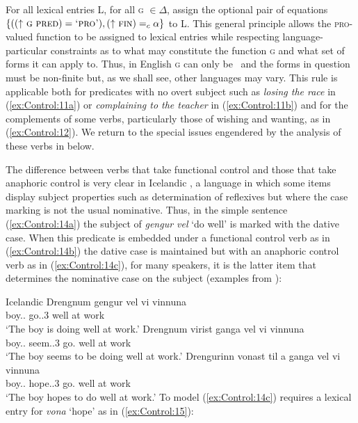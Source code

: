 \documentclass[output=paper,hidelinks]{langscibook}
\begin{document}
\ea\label{ex:Control:13}
For all lexical entries L, for all \textsc{g} $\in\Delta$, assign the optional pair of
equations $\{((\UP\ \mbox{\textsc{g}}\ \PRED)=\mbox{\textsc{`pro'}}),(\UP\ \FIN)=_c\alpha\}$ to L.
\z
This general principle allows the \textsc{pro}-valued function to be assigned to lexical entries while respecting language-particular constraints as to what may constitute the function \textsc{g} and what set of forms it can apply to. Thus, in English \textsc{g} can only be \SUBJ\ and the forms in question must be non-finite but, as we shall see, other languages may vary. This rule is applicable both for predicates with no overt subject such as \emph{losing the race} in (\ref{ex:Control:11a}) or \emph{complaining to the teacher} in (\ref{ex:Control:11b}) and for the complements of some verbs, particularly those of wishing and wanting, as in (\ref{ex:Control:12}). We return to the special issues engendered by the analysis of these verbs in  below.

The difference between verbs that take functional control and those that take anaphoric control is very clear in Icelandic \citep{Andrews82,Andrews1990}, a language in which some items display subject properties such as determination of reflexives but where the case marking is not the usual nominative. Thus, in the simple sentence (\ref{ex:Control:14a}) the subject of \emph{gengur vel} `do well' is marked with the dative case. When this predicate is embedded under a functional control verb as in (\ref{ex:Control:14b}) the dative case is maintained but with an anaphoric control verb as in (\ref{ex:Control:14c}), for many speakers, it is the latter item that determines the nominative case on the subject (examples from \citealt[(39) and (43)]{Andrews1990}):

\ea\label{ex:Control:14} Icelandic
\ea\label{ex:Control:14a} \gll Drengnum  gengur   vel vi{\texteth} vinnuna\\
 {boy.\DEF.\DAT} {go.\PRS.3\SG} well at  work\\
\glt `The boy is doing well at work.'
\ex\label{ex:Control:14b} \gll Drengnum  vir{\texteth}ist    ganga vel vi{\texteth} vinnuna\\
    {boy.\DEF.\DAT} {seem.\PRS.3\SG} {go.\INF} well at  work\\
    \glt `The boy seems to be doing well at work.'
\ex\label{ex:Control:14c} \gll Drengurinn  vonast    til a{\texteth}  ganga vel vi{\texteth} vinnuna\\
    {boy.\DEF.\NOM} {hope.\PRS.3\SG}      {go.\INF} well at  work\\
    \glt`The boy hopes to do well at work.'
\z\z
To model (\ref{ex:Control:14c}) requires a lexical entry for \emph{vona} `hope' as in (\ref{ex:Control:15}):
\end{document}
